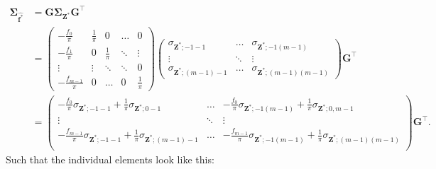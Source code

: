 ﻿\documentclass[12pt,a4paper]{scrreprt}
\theoremstyle{definition}
\begin{document}
\begin{align*}
    \boldsymbol{\Sigma}_{\hat{\boldsymbol{f}^*}} &= \boldsymbol{G} \boldsymbol{\Sigma}_{\boldsymbol{Z}^*} \boldsymbol{G}^\top \\
    &= \begin{pmatrix}
    -\frac{f_0}{\pi} &  \frac{1}{\pi} & 0 & \ldots & 0\\
    -\frac{f_1}{\pi} & 0 & \frac{1}{\pi}&\ddots & \vdots \\
    \vdots & \vdots & \ddots & \ddots & 0\\
    -\frac{f_{m-1}}{\pi}& 0 &\ldots& 0 & \frac{1}{\pi}
    \end{pmatrix}
    \begin{pmatrix}
        \sigma_{\boldsymbol{Z}^*; -1 -1}& \ldots & \sigma_{\boldsymbol{Z}^*; -1 (m-1)}\\
        \vdots & \ddots &\vdots \\
        \sigma_{\boldsymbol{Z}^*; (m-1) -1} & \ldots & \sigma_{\boldsymbol{Z}^*; (m-1) (m-1)}
    \end{pmatrix}
    \boldsymbol{G}^\top\\
    &= \begin{pmatrix}
        -\frac{f_0}{\pi}\sigma_{\boldsymbol{Z}^*; -1-1} + \frac{1}{\pi}\sigma_{\boldsymbol{Z}^*; 0 -1} &\ldots&-\frac{f_0}{\pi}\sigma_{\boldsymbol{Z}^*; -1 (m-1)} + \frac{1}{\pi}\sigma_{\boldsymbol{Z}^*; 0, m-1} \\
        \vdots & \ddots &\vdots \\
        -\frac{f_{m-1}}{\pi}\sigma_{\boldsymbol{Z}^*; -1 -1} + \frac{1}{\pi}\sigma_{\boldsymbol{Z}^*; (m-1) -1} &\ldots&-\frac{f_{m-1}}{\pi}\sigma_{\boldsymbol{Z}^*; -1 (m-1)} + \frac{1}{\pi}\sigma_{\boldsymbol{Z}^*; (m-1) (m-1)} \\
    \end{pmatrix}\boldsymbol{G}^\top.
\end{align*}
\noindent Such that the individual elements look like this:
\end{document}
